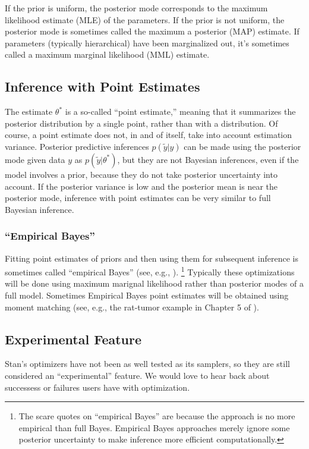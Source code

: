 If the prior is uniform, the posterior mode corresponds to the maximum
likelihood estimate (MLE) of the parameters.  If the prior is not
uniform, the posterior mode is sometimes called the maximum a
posterior (MAP) estimate.  If parameters (typically hierarchical) have
been marginalized out, it's sometimes called a maximum marginal
likelihood (MML) estimate. 


\subsection{Inference with Point Estimates}

The estimate $\theta^{*}$ is a so-called ``point estimate,'' meaning
that it summarizes the posterior distribution by a single point,
rather than with a distribution.  Of course, a point estimate does
not, in and of itself, take into account estimation variance.
Posterior predictive inferences $p(\tilde{y} | y)$ can be made using
the posterior mode given data $y$ as $p(\tilde{y}|\theta^*)$, but they
are not Bayesian inferences, even if the model involves a prior,
because they do not take posterior uncertainty into account.  If the
posterior variance is low and the posterior mean is near the posterior
mode, inference with point estimates can be very similar to full
Bayesian inference.

\subsubsection{``Empirical Bayes''}

Fitting point estimates of priors and then using them for subsequent
inference is sometimes called ``empirical Bayes'' (see, e.g.,
\citep{Efron:2012}).%
%
\footnote{The scare quotes on ``empirical Bayes'' are because the
  approach is no more empirical than full Bayes.  Empirical Bayes
  approaches merely ignore some posterior uncertainty to make
  inference more efficient computationally.}
%
Typically these optimizations will be done using maximum marignal
likelihood rather than posterior modes of a full model.  Sometimes
Empirical Bayes point estimates will be obtained using moment matching
(see, e.g., the rat-tumor example in Chapter 5 of
\citep{GelmanEtAl:2013}).


\subsection{Experimental Feature}

Stan's optimizers have not been as well tested as its samplers, so
they are still considered an ``experimental'' feature.  We would love
to hear back about successess or failures users have with
optimization.  


